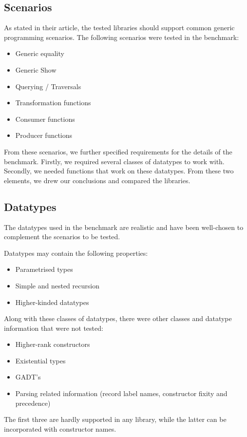 \documentclass[twocolumn,11pt,a4paper]{article}
\begin{document}
\subsection{Scenarios}
As \citet{Rodriguez:2008:art} stated in their article, the tested libraries should support common generic programming scenarios. 
The following scenarios were tested in the benchmark:

\begin{itemize}
\item Generic equality
\item Generic Show
\item Querying / Traversals
\item Transformation functions
\item Consumer functions
\item Producer functions
\end{itemize}
From these scenarios, we further specified requirements for the details of the benchmark. 
Firstly, we required several classes of datatypes to work with. 
Secondly, we needed functions that work on these datatypes.
From these two elements, we drew our conclusions and compared the libraries.

\subsection{Datatypes}

The datatypes used in the benchmark are realistic and have been well-chosen to complement the scenarios to be tested.

Datatypes may contain the following properties:

\begin{itemize}
\item Parametrised types
\item Simple and nested recursion
\item Higher-kinded datatypes
\end{itemize}

Along with these classes of datatypes, there were other classes and datatype information that were not tested:

\begin{itemize}
\item Higher-rank constructors
\item Existential types
\item GADT's
\item Parsing related information (record label names, constructor fixity and precedence)
\end{itemize}
The first three are hardly supported in any library, while the latter can be incorporated with constructor names.
\end{document}
